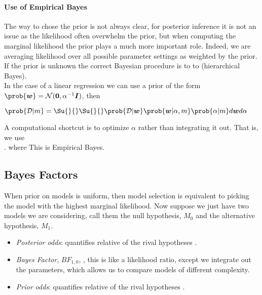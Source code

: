 \paragraph{Use of Empirical Bayes}
The way to chose the prior is not always clear, for posterior inference it is not an issue as the 
likelihood often overwhelm the prior, but when computing the marginal likelihood the prior plays a
much more important role. Indeed, we are averaging likelihood over all possible parameter settings 
as weighted by the prior.\\
If the prior is unknown the correct Bayesian procedure is to to  
(hierarchical Bayes).\\
In the case of a linear regression we can use a prior of the form $\prob{\bm{w}}=\mathcal{N}(\bm{0},
\alpha^{-1}\bm{I})$, then 
\begin{center}
    $\prob{\mathcal{D}|m} = \Su{}{}\Su{}{}\prob{\mathcal{D}|\bm{w}}\prob{\bm{w}|\alpha,m}
    \prob{\alpha|m}d\bm{w}d\alpha$
\end{center}
A computational shortcut is to optimize $\alpha$ rather than integrating it out. That is, we use\\
. where 
This is Empirical Bayes.


\subsection{Bayes Factors}
When prior on models is uniform, then model selection is equivalent to picking the model
with the highest marginal likelihood. Now suppose we just have two models we are 
considering, call them the null hypothesis, $M_{0}$ and the alternative hypothesis,
$M_{1}$.\\
\begin{itemize}
    \item \emph{Posterior odds}: quantifies relative  of the rival hypotheses
        .
    \item \emph{Bayes Factor}, $BF_{1,0}$, , 
        this is like a likelihood ratio, except we integrate out the parameters, which 
        allows us to compare models of different complexity.
    \item \emph{Prior odds}: quantifies relative  of the rival hypotheses
        .
\end{itemize}

